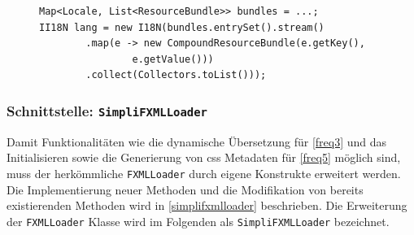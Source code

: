 \begin{figure}[H]
	\begin{lstlisting}[caption={Beispiel -- Erstellen einer I18N Instanz}, captionpos=b, label=lst:example_i18n_creation]
Map<Locale, List<ResourceBundle>> bundles = ...;
II18N lang = new I18N(bundles.entrySet().stream()
		.map(e -> new CompoundResourceBundle(e.getKey(), 
				e.getValue()))
		.collect(Collectors.toList()));
	\end{lstlisting}
\end{figure}
\subsubsection{Schnittstelle: \texttt{SimpliFXMLLoader}}
Damit Funktionalitäten wie die dynamische Übersetzung für \autoref{freq3} und das Initialisieren sowie die Generierung von \ac{css} Metadaten für \autoref{freq5} möglich sind, muss der herkömmliche \texttt{FXMLLoader} durch eigene Konstrukte erweitert werden. Die Implementierung neuer Methoden und die Modifikation von bereits existierenden Methoden wird in \autoref{simplifxmlloader} beschrieben. Die Erweiterung der \texttt{FXMLLoader} Klasse wird im Folgenden als \texttt{SimpliFXMLLoader} bezeichnet.
